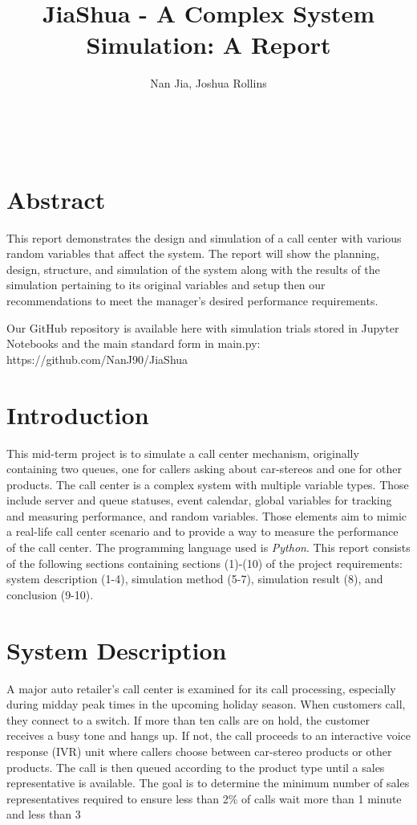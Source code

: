 \documentclass{article}
\title{JiaShua - A Complex System Simulation: A Report}
\author{Nan Jia, Joshua Rollins}
\makeatletter
\renewcommand{\maketitle}{\bgroup\setlength{\parindent}{0pt}
\begin{flushleft}
  \textbf{\LARGE \@title} \\ %
  \vspace{0.5em}
  \@author
\end{flushleft}\egroup
}
\makeatother
\begin{document}
\maketitle
\section*{Abstract}
This report demonstrates the design and simulation of a call center with various random variables that affect the system. The report will show the planning, design, structure, and simulation of the system along with the results of the simulation pertaining to its original variables and setup then our recommendations to meet the manager’s desired performance requirements.\\
\par
Our GitHub repository is available here with simulation trials stored in Jupyter Notebooks and the main standard form in main.py:
https://github.com/NanJ90/JiaShua

\section{Introduction}
This mid-term project is to simulate a call center mechanism, originally containing two queues, one for callers asking about car-stereos and one for other products. The call center is a complex system with multiple variable types. Those include server and queue statuses, event calendar, global variables for tracking and measuring performance, and random variables. Those elements aim to mimic a real-life call center scenario and to provide a way to measure the performance of the call center. The programming language used is \emph{Python}. This report consists of the following sections containing sections (1)-(10) of the project requirements: system description (1-4), simulation method (5-7), simulation result (8), and conclusion (9-10).

\section{System Description}
A major auto retailer's call center is examined for its call processing, especially during midday peak times in the upcoming holiday season. When customers call, they connect to a switch. If more than ten calls are on hold, the customer receives a busy tone and hangs up. If not, the call proceeds to an interactive voice response (IVR) unit where callers choose between car-stereo products or other products. The call is then queued according to the product type until a sales representative is available. The goal is to determine the minimum number of sales representatives required to ensure less than 2\% of calls wait more than 1 minute and less than 3%
\end{document}
